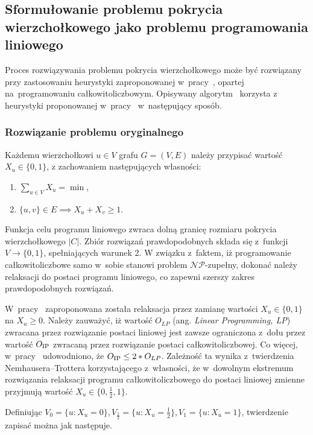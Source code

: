 \subsection{Sformułowanie problemu pokrycia wierzchołkowego jako problemu programowania liniowego}\label{section_kernelization_lp_formulation}

Proces rozwiązywania problemu pokrycia wierzchołkowego może być rozwiązany
przy zastosowaniu heurystyki zaproponowanej w~pracy~\cite{hochbaum82}, opartej 
na~programowaniu całkowitoliczbowym.
Opisywany algorytm~\cite[rozdz.~4.2.2]{abukhzam03} korzysta z~ heurystyki proponowanej w~pracy~\cite{hochbaum82} 
w~następujący sposób.

\subsubsection{\textbf{Rozwiązanie problemu oryginalnego}}\label{ss_lp_original}
Każdemu wierzchołkowi $u \in V$ grafu $G=(V,E)$ należy przypisać wartość $X_u
\in \{0, 1\}$, z zachowaniem następujących własności:
\begin{enumerate}
  \item $\sum_{u \in V}X_u = \min$,
  \item $\{u,v\} \in E \implies X_u + X_v \geq 1$.
\end{enumerate}

Funkcja celu programu liniowego zwraca dolną granicę rozmiaru pokrycia wierzchołkowego $|C|$.
Zbiór rozwiązań prawdopodobnych składa się z~funkcji $V \to \{0, 1\}$,
spełniających warunek 2.
W związku z~faktem, iż programowanie całkowitoliczbowe samo w~sobie stanowi
problem $\mathcal{NP}$-zupełny, dokonać należy relaksacji do postaci programu liniowego, co
zapewni szerszy zakres prawdopodobnych rozwiązań.

W~pracy~\cite{khuller02} zaproponowana została relaksacja przez zamianę wartości 
$X_u \in \{0,1\}$ na $X_u \geq 0$.
Należy zauważyć, iż wartość $O_{LP}$ (ang. \emph{Linear Programming, LP}) zwracana przez rozwiązanie postaci 
liniowej jest zawsze ograniczona z~dołu przez wartość $O_{\textnormal{IP}}$ zwracaną przez 
rozwiązanie postaci całkowitoliczbowej.
Co więcej, w~pracy~\cite{khuller02} udowodniono, że $O_{\textnormal{IP}} \leq 2*O_{LP}$.
Zależność ta wynika z~twierdzenia Nemhausera--Trottera korzystającego
z~własności, że w~dowolnym ekstremum rozwiązania relaksacji programu
całkowitoliczbowego do postaci liniowej zmienne przyjmują wartość 
$X_u \in \{0, \frac{1}{2}, 1\}$.

Definiując $V_0 = \{u : X_u=0\}, V_{\frac{1}{2}}=\{u: X_u=\frac{1}{2}\},
V_1=\{u: X_u=1\}$, twierdzenie zapisać można jak następuje.

